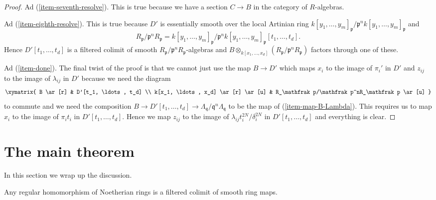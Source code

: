 \begin{proof}
\medskip\noindent
Ad (\ref{item-seventh-resolve}). This is true because we have a
section $C \to B$ in the category of $R$-algebras.

\medskip\noindent
Ad (\ref{item-eighth-resolve}). This is true because $D'$ is
essentially smooth over the local Artinian ring
$k[y_1, \ldots, y_m]_\mathfrak p/\mathfrak p^n k[y_1, \ldots, y_m]_\mathfrak p$
and
$$
R_\mathfrak p/\mathfrak p^nR_\mathfrak p =
k[y_1, \ldots, y_m]_\mathfrak p/
\mathfrak p^n k[y_1, \ldots, y_m]_\mathfrak p[t_1, \ldots, t_d].
$$
Hence $D'[t_1, \ldots, t_d]$ is a filtered colimit of smooth
$R_\mathfrak p/\mathfrak p^nR_\mathfrak p$-algebras and
$B \otimes_{k[x_1, \ldots, x_d]} (R_\mathfrak p/\mathfrak p^nR_\mathfrak p)$
factors through one of these.

\medskip\noindent
Ad (\ref{item-done}). The final twist of the proof is that we cannot
just use the map $B \to D'$ which maps $x_i$ to the image of $\pi_i'$
in $D'$ and $z_{ij}$ to the image of $\lambda_{ij}$ in $D'$
because we need the diagram
$$
\xymatrix{
B \ar[r] & D'[t_1, \ldots, t_d] \\
k[x_1, \ldots, x_d] \ar[r] \ar[u] &
R_\mathfrak p/\mathfrak p^nR_\mathfrak p \ar[u]
}
$$
to commute and we need the composition
$B \to D'[t_1, \ldots, t_d] \to
\Lambda_\mathfrak q/\mathfrak q^n\Lambda_\mathfrak q$
to be the map of (\ref{item-map-B-Lambda}).
This requires us to map $x_i$ to the image of
$\pi_i t_i$ in $D'[t_1, \ldots, t_d]$.
Hence we map $z_{ij}$ to the image of
$\lambda_{ij} t_i^{2N} / \delta_i^{2N}$ in $D'[t_1, \ldots, t_d]$
and everything is clear.
\end{proof}







\section{The main theorem}
\label{section-main}

\noindent
In this section we wrap up the discussion.

\begin{theorem}[Popescu]
\label{theorem-popescu}
Any regular homomorphism of Noetherian rings is a filtered colimit
of smooth ring maps.
\end{theorem}

